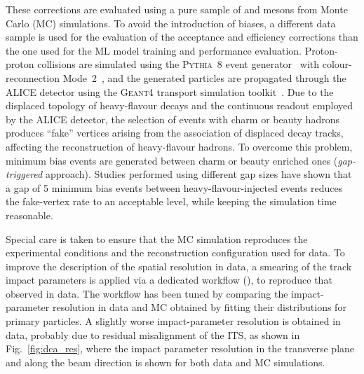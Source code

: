 These corrections are evaluated using a pure sample of \ds and \dpl mesons from Monte Carlo (MC) simulations. To avoid the introduction of biases, a different data sample is used for the evaluation of the acceptance and efficiency corrections than the one used for the ML model training and performance evaluation. Proton-proton collisions are simulated using the \textsc{Pythia~8} event generator~\cite{Bierlich:2022pfr} with colour-reconnection Mode~2~\cite{Christiansen:2015yqa}, and the generated particles are propagated through the ALICE detector using the \textsc{Geant4} transport simulation toolkit~\cite{GEANT4:2002zbu}. Due to the displaced topology of heavy-flavour decays and the continuous readout employed by the ALICE detector, the selection of events with charm or beauty hadrons produces ``fake'' vertices arising from the association of displaced decay tracks, affecting the reconstruction of heavy-flavour hadrons. To overcome this problem, minimum bias events are generated between charm or beauty enriched ones (\emph{gap-triggered} approach). Studies performed using different gap sizes have shown that a gap of 5 minimum bias events between heavy-flavour-injected events reduces the fake-vertex rate to an acceptable level, while keeping the simulation time reasonable.

Special care is taken to ensure that the MC simulation reproduces the experimental conditions and the reconstruction configuration used for data. To improve the description of the spatial resolution in data, a smearing of the track impact parameters is applied via a dedicated workflow (), to reproduce that observed in data. The workflow has been tuned by comparing the impact-parameter resolution in data and MC obtained by fitting their distributions for primary particles. A slightly worse impact-parameter resolution is obtained in data, probably due to residual misalignment of the ITS, as shown in Fig.~\ref{fig:dca_res}, where the impact parameter resolution in the transverse plane and along the beam direction is shown for both data and MC simulations.

